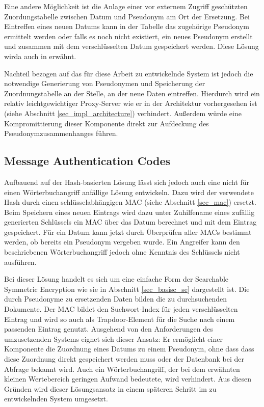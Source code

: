 Eine andere Möglichkeit ist die Anlage einer vor externem Zugriff geschützten Zuordungstabelle zwischen Datum und Pseudonym am Ort der Ersetzung. Bei Eintreffen eines neuen Datums kann in der Tabelle das zugehörige Pseudonym ermittelt werden oder falls es noch nicht existiert, ein neues Pseudonym erstellt und zusammen mit dem verschlüsselten Datum gespeichert werden. Diese Lösung wirda auch in \cite{goh2003} erwähnt.

Nachteil bezogen auf das für diese Arbeit zu entwickelnde System ist jedoch die notwendige Generierung von Pseudonymen und Speicherung der Zuordnungstabelle an der Stelle, an der neue Daten eintreffen. Hierdurch wird ein relativ leichtgewichtiger Proxy-Server wie er in der Architektur vorhergesehen ist (siehe Abschnitt \ref{sec_impl_architecture}) verhindert. Außerdem würde eine Kompromittierung dieser Komponente direkt zur Aufdeckung des Pseudonymzusammenhanges führen. 

\subsection{Message Authentication Codes}

\label{sec_state_se_mac}

Aufbauend auf der Hash-basierten Lösung lässt sich jedoch auch eine nicht für einen Wörterbuchangriff anfällige Lösung entwickeln. Dazu wird der verwendete Hash durch einen schlüsselabhängigen MAC (siehe Abschnitt \ref{sec_mac}) ersetzt. Beim Speichern eines neuen Eintrags wird dazu unter Zuhilfename eines zufällig generierten Schlüssels ein MAC über das Datum berechnet und mit dem Eintrag gespeichert. Für ein Datum kann jetzt durch Überprüfen aller MACs bestimmt werden, ob bereits ein Pseudonym vergeben wurde. Ein Angreifer kann den beschriebenen Wörterbuchangriff jedoch ohne Kenntnis des Schlüssels nicht ausführen.

Bei dieser Lösung handelt es sich um eine einfache Form der Searchable Symmetric Encryption wie sie in Abschnitt \ref{sec_basisc_se} dargestellt ist. Die durch Pseudonyme zu ersetzenden Daten bilden die zu durchsuchenden Dokumente. Der MAC bildet den Suchwort-Index für jeden verschlüsselten Eintrag und wird so auch als Trapdoor-Element für die Suche nach einem passenden Eintrag genutzt. Ausgehend von den Anforderungen des umzusetzenden Systems eignet sich dieser Ansatz: Er ermöglicht einer Komponente die Zuordnung eines Datums zu einem Pseudonym, ohne dass dass diese Zuordnung direkt gespeichert werden muss oder der Datenbank bei der Abfrage bekannt wird. Auch ein Wörterbuchangriff, der bei dem erwähnten kleinen Wertebereich geringen Aufwand bedeutete, wird verhindert. Aus diesen Gründen wird dieser Lösungsansatz in einem späteren Schritt im zu entwickelnden System umgesetzt.

